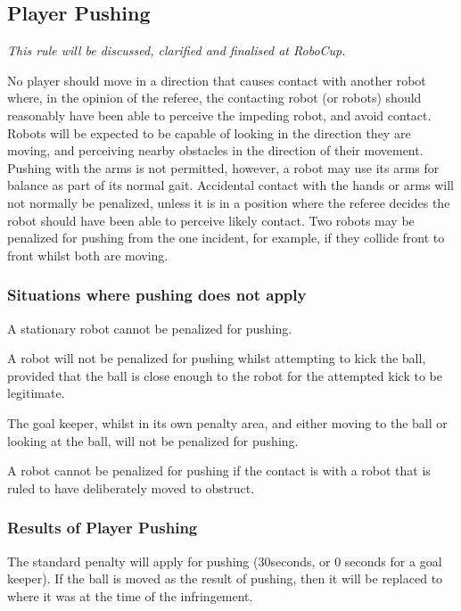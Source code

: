\documentclass[12pt]{article}
\begin{document}
\subsection{Player Pushing}
\label{sec:player_pushing}

\emph{This rule will be discussed, clarified and finalised at RoboCup.}

No player should move in a direction that causes contact with another robot where, in the opinion of the referee, the contacting robot (or robots) should reasonably have been able to perceive the impeding robot, and avoid contact. Robots will be expected to be capable of looking in the direction they are moving, and perceiving nearby obstacles in the direction of their movement. Pushing with the arms is not permitted, however, a robot may use its arms for balance as part of its normal gait. Accidental contact with the hands or arms will not normally be penalized, unless it is in a position where the referee decides the robot should have been able to perceive likely contact.  Two robots may be penalized for pushing from the one incident, for example, if they collide front to front whilst both are moving.

\subsubsection{Situations where pushing does not apply}

A stationary robot cannot be penalized for pushing.

A robot will not be penalized for pushing whilst attempting to kick the ball, provided that the ball is close enough to the robot for the attempted kick to be legitimate.

The goal keeper, whilst in its own penalty area, and either moving to the ball or looking at the ball, will not be penalized for pushing.

A robot cannot be penalized for pushing if the contact is with a robot that is ruled to have deliberately moved to obstruct.

\subsubsection{Results of Player Pushing}

The standard penalty will apply for pushing (30seconds, or 0 seconds for a goal keeper). If the ball is moved as the result of pushing, then it will be replaced to where it was at the time of the infringement.
\end{document}
